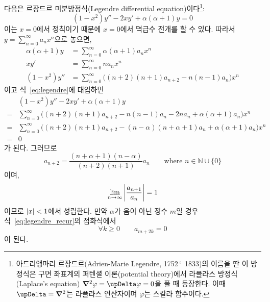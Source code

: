 \documentclass[../engineering_mathematics_lecture_note.tex]{subfiles}
\begin{document}
\begin{example}
    다음은 르장드르 미분방정식(Legendre differential equation)이다\footnote{아드리앵마리 르장드르(Adrien-Marie Legendre, 1752\,\char`~1833)의 이름을 딴 이 방정식은 구면 좌표계의 퍼텐셜 이론(potential theory)에서 라플라스 방정식(Laplace's equation) $\grad^2 \varphi = \upDelta \varphi = 0$을 풀 때 등장한다. 이때 $\upDelta = \grad^2$는 라플라스 연산자이며 $\varphi$는 스칼라 함수이다.}:
    \begin{equation} \label{eq:legendre}
        (1 - x^2)y'' - 2xy' + \alpha(\alpha + 1)y = 0
    \end{equation}
    이는 $x = 0$에서 정칙이기 때문에 $x = 0$에서 멱급수 전개를 할 수 있다.
    따라서 $y = \sum^{\infty}_{n = 0} a_n x^n$으로 놓으면,
    \begin{align*}
        \alpha (\alpha + 1) y &= \sum^{\infty}_{n = 0} \alpha (\alpha + 1) a_n x^n\\
        xy' &= \sum^{\infty}_{n = 0} n a_n x^n\\
        (1 - x^2) y'' &= \sum^{\infty}_{n = 0} \bigl((n + 2)(n + 1) a_{n + 2} - n(n - 1) a_n \bigr) x^n
    \end{align*}
    이고 식~\ref{eq:legendre}에 대입하면
    \begin{align*}
        &(1 - x^2)y'' - 2xy' + \alpha (\alpha + 1) y\\
        = &\sum^{\infty}_{n = 0} \bigl((n + 2)(n + 1) a_{n + 2} - n(n - 1) a_n - 2na_n + \alpha (\alpha + 1) a_n \bigr) x^n\\
        = &\sum^{\infty}_{n = 0}\bigl((n + 2)(n + 1) a_{n + 2} - (n - \alpha)(n + \alpha + 1)a_n + \alpha (\alpha + 1) a_n \bigr) x^n\\
        = &0
    \end{align*}
    가 된다.
    그러므로
    \begin{equation} \label{eq:legendre_recur}
        a_{n + 2} = \frac{(n + \alpha + 1)(n - \alpha)}{(n + 2)(n + 1)} a_n \qquad \text{where } n \in \mathbb N \cup \{0\}
    \end{equation}
    이며,
    \begin{equation*}
        \lim_{n \to \infty} \abs{\frac{a_{n + 1}}{a_n}} = 1
    \end{equation*}
    이므로 $\abs{x} < 1$에서 성립한다.
    만약 $\alpha$가 음이 아닌 정수 $m$일 경우 식~\ref{eq:legendre_recur}의 점화식에서
    \begin{equation*}
        \forall k \geq 0 \qquad a_{m + 2k} = 0
    \end{equation*}
    이 된다.

\end{example}
\end{document}
